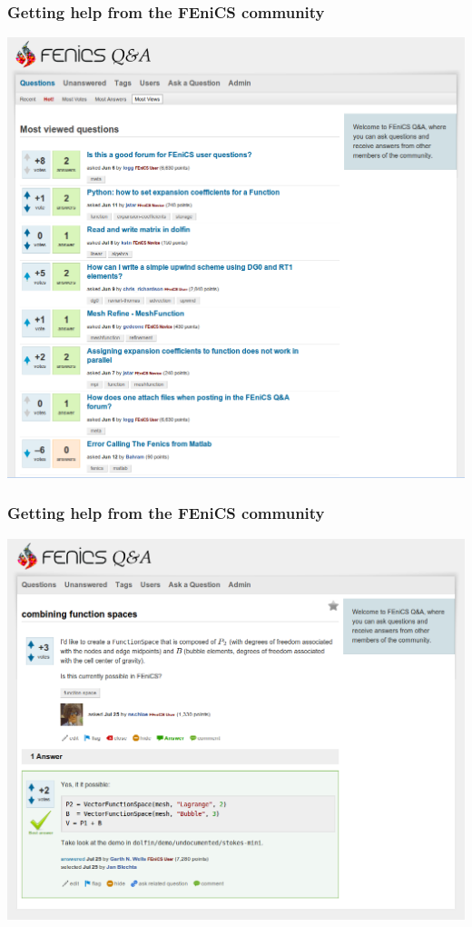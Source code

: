\begin{frame}
    \frametitle{Getting help from the FEniCS community}
    \begin{center}
        \includegraphics[height=0.75\textheight]{png/qa_overview.png}
        \vspace{1em}
        \small
    \end{center}
\end{frame}

\begin{frame}
    \frametitle{Getting help from the FEniCS community}
    \begin{center}
        \includegraphics[height=0.75\textheight]{png/qa_example.png}
        \vspace{1em}
        \small
    \end{center}
\end{frame}

